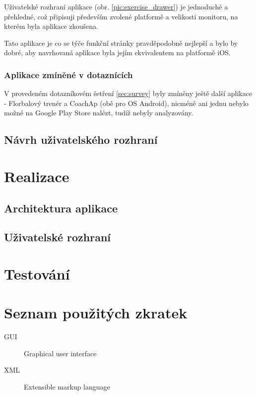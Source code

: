 \documentclass[thesis=B,czech]{FITthesis}[2012/06/26]
\begin{document}
	Uživatelské rozhraní aplikace (obr. \ref{pic:exercise_drawer}) je jednoduché a přehledné, což připisuji především zvolené platformě a velikosti monitoru, na kterém byla aplikace zkoušena.

	Tato aplikace je co se týče funkční stránky pravděpodobně nejlepší a bylo by dobré, aby navrhovaná aplikace byla jejím ekvivalentem na platformě iOS.

	\subsection{Aplikace zmíněné v dotaznících}

	V provedeném dotazníkovém šetření \ref{sec:survey} byly zmíněny ještě další aplikace \-- Florbalový trenér a CoachAp (obě pro OS Android), nicméně ani jednu nebylo možné na Google Play Store nalézt, tudíž nebyly analyzovány.

\section{Návrh uživatelského rozhraní}

\chapter{Realizace}

\section{Architektura aplikace}

\section{Uživatelské rozhraní}

\chapter{Testování}

\begin{conclusion}
\end{conclusion}




\appendix

\chapter{Seznam použitých zkratek}
\begin{description}
	\item[GUI] Graphical user interface
	\item[XML] Extensible markup language
\end{description}
\end{document}
